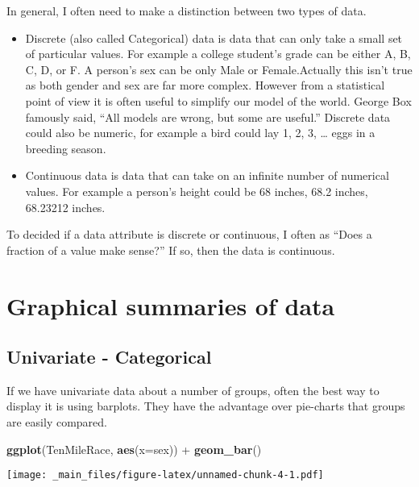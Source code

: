 \documentclass[]{book}
\newenvironment{Shaded}{\begin{snugshade}}{\end{snugshade}}
\newcommand{\KeywordTok}[1]{\textcolor[rgb]{0.13,0.29,0.53}{\textbf{{#1}}}}
\newcommand{\DataTypeTok}[1]{\textcolor[rgb]{0.13,0.29,0.53}{{#1}}}
\newcommand{\StringTok}[1]{\textcolor[rgb]{0.31,0.60,0.02}{{#1}}}
\newcommand{\NormalTok}[1]{{#1}}
\providecommand{\tightlist}{%
  \setlength{\itemsep}{0pt}\setlength{\parskip}{0pt}}
\begin{document}
In general, I often need to make a distinction between two types of
data.

\begin{itemize}
\tightlist
\item
  Discrete (also called Categorical) data is data that can only take a
  small set of particular values. For example a college student's grade
  can be either A, B, C, D, or F. A person's sex can be only Male or
  Female.Actually this isn't true as both gender and sex are far more
  complex. However from a statistical point of view it is often useful
  to simplify our model of the world. George Box famously said, ``All
  models are wrong, but some are useful.'' Discrete data could also be
  numeric, for example a bird could lay 1, 2, 3, \ldots{} eggs in a
  breeding season.
\item
  Continuous data is data that can take on an infinite number of
  numerical values. For example a person's height could be 68 inches,
  68.2 inches, 68.23212 inches.
\end{itemize}

To decided if a data attribute is discrete or continuous, I often as
``Does a fraction of a value make sense?'' If so, then the data is
continuous.

\section{Graphical summaries of data}\label{graphical-summaries-of-data}

\subsection{Univariate - Categorical}\label{univariate---categorical}

If we have univariate data about a number of groups, often the best way
to display it is using barplots. They have the advantage over pie-charts
that groups are easily compared.

\begin{Shaded}
\begin{Highlighting}[]
\KeywordTok{ggplot}\NormalTok{(TenMileRace, }\KeywordTok{aes}\NormalTok{(}\DataTypeTok{x=}\NormalTok{sex)) +}\StringTok{ }\KeywordTok{geom_bar}\NormalTok{()}
\end{Highlighting}
\end{Shaded}

\texttt{[image: \_main\_files/figure-latex/unnamed-chunk-4-1.pdf]}
\end{document}
